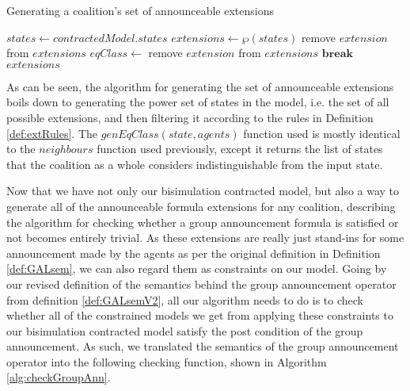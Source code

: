 \begin{algorithm}
	\caption{Generating a coalition's set of announceable extensions}
	\label{alg:genAnnExts}
	\begin{algorithmic}
			\State $states \gets contractedModel.states$
			\State $extensions \gets \wp(states)$
					\State remove $extension$ from $extensions$
				\Else
						\State $eqClass \gets $
								\State remove $extension$ from $extensions$
								\State $\mathbf{break}$
							\EndIf
						\EndFor
					\EndFor
				\EndIf				
			\EndFor
			\State \Return $extensions$
		\EndFunction
	\end{algorithmic}
\end{algorithm}

As can be seen, the algorithm for generating the set of announceable extensions boils down to generating the power set of states in the model, i.e. the set of all possible extensions, and then filtering it according to the rules in Definition \ref{def:extRules}. The $genEqClass(state, agents)$ function used is mostly identical to the $neighbours$ function used previously, except it returns the list of states that the coalition as a whole considers indistinguishable from the input state. 

Now that we have not only our bisimulation contracted model, but also a way to generate all of the announceable formula extensions for any coalition, describing the algorithm for checking whether a group announcement formula is satisfied or not becomes entirely trivial. As these extensions are really just stand-ins for some announcement made by the agents as per the original definition in Definition \ref{def:GALsem}, we can also regard them as constraints on our model. Going by our revised definition of the semantics behind the group announcement operator from definition \ref{def:GALsemV2}, all our algorithm needs to do is to check whether all of the constrained models we get from applying these constraints to our bisimulation contracted model satisfy the post condition of the group announcement. As such, we translated the semantics of the group announcement operator into the following checking function, shown in Algorithm \ref{alg:checkGroupAnn}.

